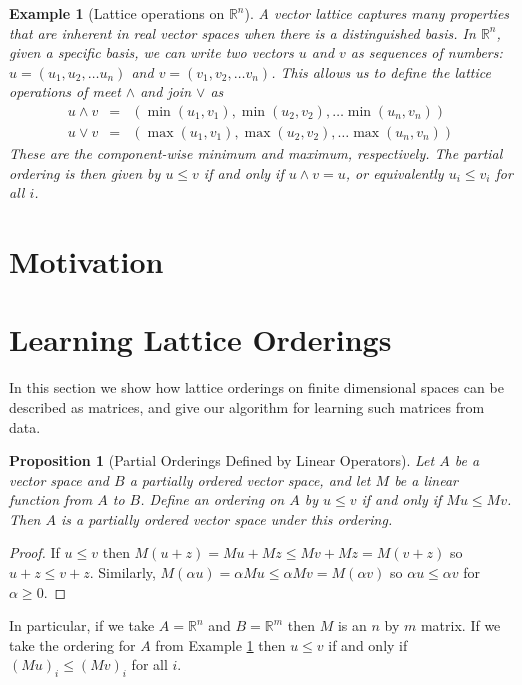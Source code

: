 \documentclass{article}
\newtheorem{proposition}{Proposition}
\newtheorem{example}{Example}
\newcommand{\R}{\mathbb{R}}
\begin{document}
\begin{example}[Lattice operations on $\R^n$]
  \label{example:finite}
  A vector lattice captures many properties that are inherent in real
  vector spaces when there is a \emph{distinguished basis}. In $\R^n$,
  given a specific basis, we can write two vectors $u$ and $v$ as
  sequences of numbers: $u = (u_1,u_2,\ldots u_n)$ and $v =
  (v_1,v_2,\ldots v_n)$. This allows us to define the lattice
  operations of meet $\land$ and join $\lor$ as
\begin{eqnarray}
u\land v &=& (\min(u_1,v_1),\min(u_2,v_2),\ldots \min(u_n,v_n))\\
u\lor v &=& (\max(u_1,v_1),\max(u_2,v_2),\ldots \max(u_n,v_n))
\end{eqnarray}
These are the component-wise minimum and maximum, respectively. The partial
ordering is then given by $u \le v$ if and only if $u \land v = u$, or
equivalently $u_i \le v_i$ for all $i$.
\end{example}

\section{Motivation}



\section{Learning Lattice Orderings}

In this section we show how lattice orderings on finite dimensional
spaces can be described as matrices, and give our algorithm for
learning such matrices from data.

\begin{proposition}[Partial Orderings Defined by Linear Operators]
  Let $A$ be a vector space and $B$ a partially ordered vector space,
  and let $M$ be a linear function from $A$ to $B$. Define an ordering
  on $A$ by $u\le v$ if and only if $Mu \le Mv$. Then $A$ is a
  partially ordered vector space under this ordering.
\end{proposition}

\begin{proof}
If $u \le v$ then $M(u + z) = Mu + Mz \le Mv + Mz = M(v +
z)$ so $u + z \le v + z$. Similarly, $M(\alpha u) = \alpha Mu
\le\alpha Mv = M(\alpha v)$ so $\alpha u \le \alpha v$ for
$\alpha \ge 0$.
\end{proof}

In particular, if we take $A = \R^n$ and $B = \R^m$ then $M$ is an $n$
by $m$ matrix. If we take the ordering for $A$ from Example
\ref{example:finite} then $u\le v$ if and only if $(Mu)_i \le (Mv)_i$
for all $i$.
\end{document}
